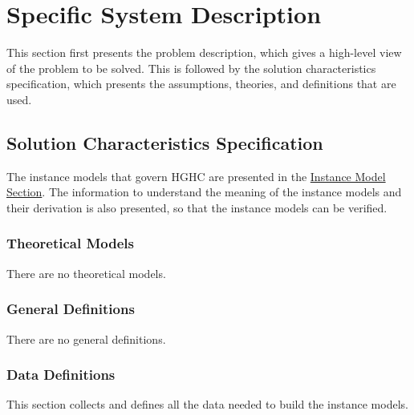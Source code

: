 \documentclass[12pt]{article}
\begin{document}
\section{Specific System Description}
\label{Sec:SpecSystDesc}
This section first presents the problem description, which gives a high-level view of the problem to be solved. This is followed by the solution characteristics specification, which presents the assumptions, theories, and definitions that are used.

\subsection{Solution Characteristics Specification}
\label{Sec:SolCharSpec}
The instance models that govern HGHC are presented in the \hyperref[Sec:IMs]{Instance Model Section}. The information to understand the meaning of the instance models and their derivation is also presented, so that the instance models can be verified.

\subsubsection{Theoretical Models}
\label{Sec:TMs}
There are no theoretical models.

\subsubsection{General Definitions}
\label{Sec:GDs}
There are no general definitions.

\subsubsection{Data Definitions}
\label{Sec:DDs}
This section collects and defines all the data needed to build the instance models.
\end{document}
